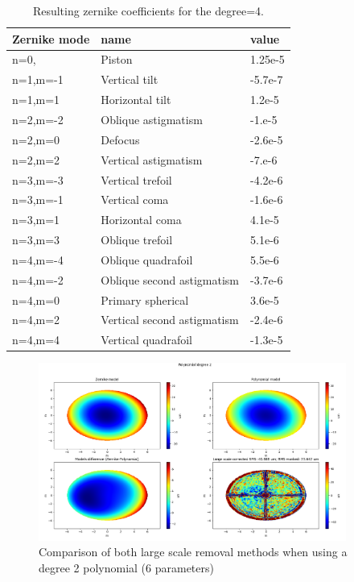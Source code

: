 \begin{table}[]
    \label{table:zernike_modes}
    \centering
    \caption{Resulting zernike coefficients for the degree=4.}
\begin{tabular}{|l|l|l|}
\hline
Zernike mode & name                         &  value  \\ \hline
n=0,         & Piston                       &  1.25e-5 \\ \hline
n=1,m=-1     & Vertical tilt                &  -5.7e-7 \\ \hline
n=1,m=1      & Horizontal tilt              &  1.2e-5   \\ \hline
n=2,m=-2     & Oblique astigmatism          &  -1.e-5   \\ \hline
n=2,m=0      & Defocus                      &  -2.6e-5   \\ \hline
n=2,m=2      & Vertical astigmatism         &  -7.e-6   \\ \hline
n=3,m=-3     & Vertical trefoil             &  -4.2e-6   \\ \hline
n=3,m=-1     & Vertical coma                &  -1.6e-6   \\ \hline
n=3,m=1      & Horizontal coma              &  4.1e-5   \\ \hline
n=3,m=3      & Oblique trefoil              &  5.1e-6   \\ \hline
n=4,m=-4     & Oblique quadrafoil           &  5.5e-6   \\ \hline
n=4,m=-2     & Oblique second astigmatism   &  -3.7e-6   \\ \hline
n=4,m=0      & Primary spherical            &  3.6e-5   \\ \hline
n=4,m=2      & Vertical second astigmatism  &  -2.4e-6   \\ \hline
n=4,m=4      & Vertical quadrafoil          &  -1.3e-5   \\ \hline
\end{tabular}
\end{table}




\begin{figure}
    \centering
    \includegraphics[width=0.9\textwidth]{images/large_scale_comp_2.png}
    \caption{Comparison of both large scale removal methods when using a degree 2 polynomial (6 parameters)}
    \label{fig:large_scale_comp_2}
\end{figure}


